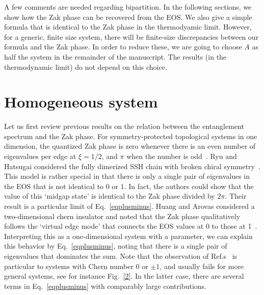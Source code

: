 \documentclass[twocolumn,amsmath,longbibliography,amssymb,superscriptaddress]{revtex4-1}
\begin{document}
A few comments are needed regarding  bipartition. 
In the following sections, we show how the Zak phase can be recovered from the EOS.
We also give a simple formula that is identical to the Zak phase in the thermodyamic limit.  
However, for a generic, finite size system, there will be finite-size discrepancies between our formula and the Zak phase.
In order to reduce these, we are going to choose $A$ as half the system in the remainder of the manuscript.
The results (in the thermodynamic limit) do not depend on this choice. 
\section{Homogeneous system}

Let us first review previous results on the relation between the entanglement spectrum and the Zak phase. 
For symmetry-protected topological systems in one dimension, the quantized Zak phase is zero whenever there is an even number  of eigenvalues per edge at $\xi = 1/2$, and $\pi$ when the number is odd~\cite{Peschel2008}. 
Ryu and Hatsugai considered the fully dimerized SSH chain with broken chiral symmetry~\cite{Ryu2006}.  
This model is rather special in that there is only a single pair of eigenvalues in the EOS that is not identical to $0$ or $1$. 
In fact, the authors could show that the value of this `midgap state' is identical to the Zak phase divided by $2\pi$. 
Their result is a particular limit of Eq.~\eqref{eqplusminus}. 
%
Huang and Arovas considered a two-dimensional chern insulator and noted that the Zak phase qualitatively follows the `virtual edge mode' that connects the EOS values at 0 to those at 1~\cite{Huang2012,Huang2012-2}. 
Interpreting this as a one-dimensional system with a parameter, we can explain this behavior by Eq.~\eqref{eqplusminus}, noting that there is a single pair of eigenvalues that dominates the sum. 
Note that the observation of Ref.s~\cite{Huang2012,Huang2012-2} is particular to systems with Chern number 0 or $\pm 1$, and usually fails for more general systems, see for instance Fig.~\ref{2}.  
In the latter case, there are several terms in Eq.~\eqref{eqplusminus} with comparably large contributions. 
\end{document}
